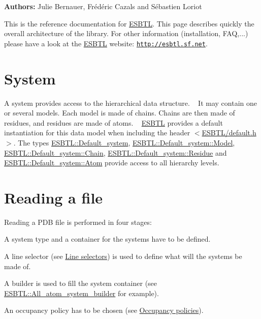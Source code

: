 {\bfseries Authors\+:} Julie Bernauer, Frédéric Cazals and Sébastien Loriot

This is the reference documentation for \hyperlink{namespaceESBTL}{E\+S\+B\+TL}. This page describes quickly the overall architecture of the library. For other information (installation, F\+AQ,...) please have a look at the \hyperlink{namespaceESBTL}{E\+S\+B\+TL} website\+: \href{http://esbtl.sf.net}{\tt http\+://esbtl.\+sf.\+net}.\hypertarget{index_sec_system}{}\section{System}\label{index_sec_system}
A system provides access to the hierarchical data structure. ~\newline
It may contain one or several models. Each model is made of chains. Chains are then made of residues, and residues are made of atoms. ~\newline
\hyperlink{namespaceESBTL}{E\+S\+B\+TL} provides a default instantiation for this data model when including the header $<$\hyperlink{default_8h}{E\+S\+B\+T\+L/default.\+h}$>$. The types \hyperlink{namespaceESBTL_a80ccb2de0f963d73a45f0bce33397cd2}{E\+S\+B\+T\+L\+::\+Default\+\_\+system}, \hyperlink{classESBTL_1_1Molecular__system_ac99c9f22457fd0498324fb5cfc276227}{E\+S\+B\+T\+L\+::\+Default\+\_\+system\+::\+Model}, \hyperlink{classESBTL_1_1Molecular__system_a7d3b3623db6fbe82b1f4a73138894617}{E\+S\+B\+T\+L\+::\+Default\+\_\+system\+::\+Chain}, \hyperlink{classESBTL_1_1Molecular__system_a87f7fdfbb412bff03287ed8d1416b392}{E\+S\+B\+T\+L\+::\+Default\+\_\+system\+::\+Residue} and \hyperlink{classESBTL_1_1Molecular__system_aae37491a328fde3bc58171d68c998c7c}{E\+S\+B\+T\+L\+::\+Default\+\_\+system\+::\+Atom} provide access to all hierarchy levels.\hypertarget{index_sec_readfile}{}\section{Reading a file}\label{index_sec_readfile}
Reading a P\+DB file is performed in four stages\+:
\begin{DoxyItemize}
\item A system type and a container for the systems have to be defined.
\item A line selector (see \hyperlink{group__linesel}{Line selectors}) is used to define what will the systems be made of.
\item A builder is used to fill the system container (see \hyperlink{classESBTL_1_1All__atom__system__builder}{E\+S\+B\+T\+L\+::\+All\+\_\+atom\+\_\+system\+\_\+builder} for example).
\item An occupancy policy has to be chosen (see \hyperlink{group__occpol}{Occupancy policies}).
\end{DoxyItemize}

